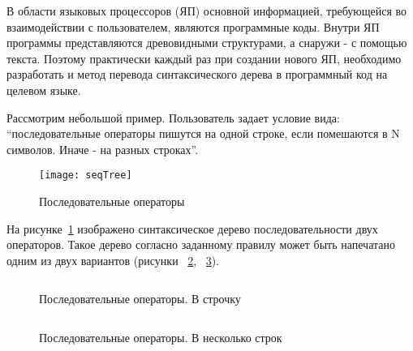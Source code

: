 
В области языковых процессоров (ЯП) основной информацией, требующейся во взаимодействии с пользователем, являются программные коды. Внутри ЯП программы представляются древовидными структурами, а снаружи - с помощью текста. Поэтому практически каждый раз при создании нового ЯП, необходимо разработать и метод перевода синтаксического дерева в программный код на целевом языке.


Рассмотрим небольшой пример. Пользователь задает условие вида: “последовательные операторы пишутся на одной строке, если помешаются в N символов. Иначе - на разных строках”.


\begin{figure}[h]
	\centering
	\texttt{[image: seqTree]}
	\caption{Последовательные операторы}
	\label{fig:seqImage}
\end{figure}

На рисунке~\ref{fig:seqImage} изображено синтаксическое дерево последовательности двух операторов. Такое дерево согласно заданному правилу может быть напечатано одним из двух вариантов (рисунки ~\ref{fig:seqCode1}, ~\ref{fig:seqCode2}).

\begin{figure}[h]
	\inputminted{c}{codes/seqCode1.java}
	\caption{Последовательные операторы. В строчку}
	\label{fig:seqCode1}
\end{figure}

\begin{figure}[h]
	\inputminted{c}{codes/seqCode2.java}
	\caption{Последовательные операторы. В несколько строк}
	\label{fig:seqCode2}
\end{figure}

